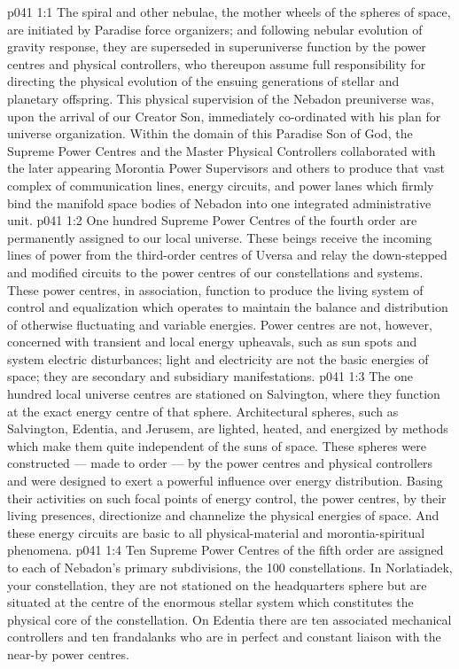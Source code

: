 \vs p041 1:1 The spiral and other nebulae, the mother wheels of the spheres of space, are initiated by Paradise force organizers; and following nebular evolution of gravity response, they are superseded in superuniverse function by the power centres and physical controllers, who thereupon assume full responsibility for directing the physical evolution of the ensuing generations of stellar and planetary offspring. This physical supervision of the Nebadon preuniverse was, upon the arrival of our Creator Son, immediately co\hyp{}ordinated with his plan for universe organization. Within the domain of this Paradise Son of God, the Supreme Power Centres and the Master Physical Controllers collaborated with the later appearing Morontia Power Supervisors and others to produce that vast complex of communication lines, energy circuits, and power lanes which firmly bind the manifold space bodies of Nebadon into one integrated administrative unit.
\vs p041 1:2 One hundred Supreme Power Centres of the fourth order are permanently assigned to our local universe. These beings receive the incoming lines of power from the third\hyp{}order centres of Uversa and relay the down\hyp{}stepped and modified circuits to the power centres of our constellations and systems. These power centres, in association, function to produce the living system of control and equalization which operates to maintain the balance and distribution of otherwise fluctuating and variable energies. Power centres are not, however, concerned with transient and local energy upheavals, such as sun spots and system electric disturbances; light and electricity are not the basic energies of space; they are secondary and subsidiary manifestations.
\vs p041 1:3 The one hundred local universe centres are stationed on Salvington, where they function at the exact energy centre of that sphere. Architectural spheres, such as Salvington, Edentia, and Jerusem, are lighted, heated, and energized by methods which make them quite independent of the suns of space. These spheres were constructed --- made to order --- by the power centres and physical controllers and were designed to exert a powerful influence over energy distribution. Basing their activities on such focal points of energy control, the power centres, by their living presences, directionize and channelize the physical energies of space. And these energy circuits are basic to all physical\hyp{}material and morontia\hyp{}spiritual phenomena.
\vs p041 1:4 Ten Supreme Power Centres of the fifth order are assigned to each of Nebadon’s primary subdivisions, the 100 constellations. In Norlatiadek, your constellation, they are not stationed on the headquarters sphere but are situated at the centre of the enormous stellar system which constitutes the physical core of the constellation. On Edentia there are ten associated mechanical controllers and ten frandalanks who are in perfect and constant liaison with the near-by power centres.
